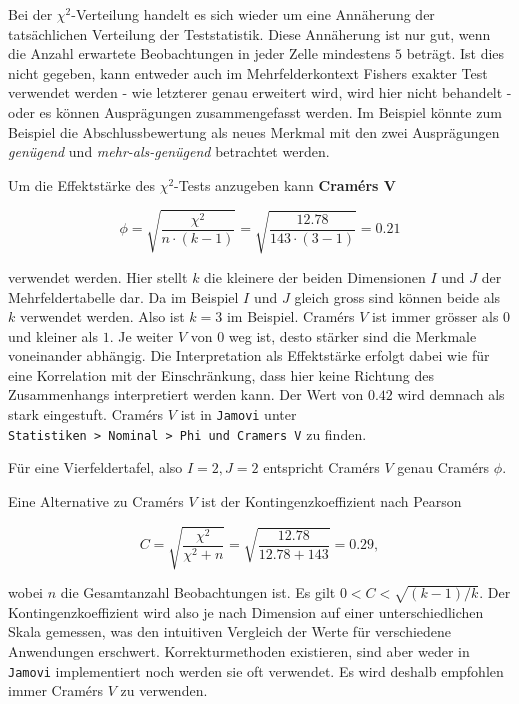 \documentclass[
]{book}
\theoremstyle{definition}
\theoremstyle{definition}
\theoremstyle{definition}
\theoremstyle{definition}
\theoremstyle{remark}
\begin{document}
Bei der \(\chi^2\)-Verteilung handelt es sich wieder um eine Annäherung der tatsächlichen Verteilung der Teststatistik. Diese Annäherung ist nur gut, wenn die Anzahl erwartete Beobachtungen in jeder Zelle mindestens \(5\) beträgt. Ist dies nicht gegeben, kann entweder auch im Mehrfelderkontext Fishers exakter Test verwendet werden - wie letzterer genau erweitert wird, wird hier nicht behandelt - oder es können Ausprägungen zusammengefasst werden. Im Beispiel könnte zum Beispiel die Abschlussbewertung als neues Merkmal mit den zwei Ausprägungen \emph{genügend} und \emph{mehr-als-genügend} betrachtet werden.

\label{customdef-cramers-v}{Um die Effektstärke des \(\chi^2\)-Tests anzugeben kann \textbf{Cramérs V}}

\[\phi = \sqrt{\frac{\chi^2}{n\cdot (k-1)}} = \sqrt{\frac{12.78}{143\cdot (3-1)}} = 0.21\]

verwendet werden. Hier stellt \(k\) die kleinere der beiden Dimensionen \(I\) und \(J\) der Mehrfeldertabelle dar. Da im Beispiel \(I\) und \(J\) gleich gross sind können beide als \(k\) verwendet werden. Also ist \(k = 3\) im Beispiel. Cramérs \(V\) ist immer grösser als \(0\) und kleiner als \(1\). Je weiter \(V\) von \(0\) weg ist, desto stärker sind die Merkmale voneinander abhängig. Die Interpretation als Effektstärke erfolgt dabei wie für eine Korrelation mit der Einschränkung, dass hier keine Richtung des Zusammenhangs interpretiert werden kann. Der Wert von \(0.42\) wird demnach als stark eingestuft. Cramérs \(V\) ist in \texttt{Jamovi} unter \texttt{Statistiken\ \textgreater{}\ Nominal\ \textgreater{}\ Phi\ und\ Cramer\textquotesingle{}s\ V} zu finden.

Für eine Vierfeldertafel, also \(I = 2, J = 2\) entspricht Cramérs \(V\) genau Cramérs \(\phi\).

Eine Alternative zu Cramérs \(V\) ist der Kontingenzkoeffizient nach Pearson

\[C = \sqrt{\frac{\chi^2}{\chi^2+n}} = \sqrt{\frac{12.78}{12.78+143}} = 0.29, \]

wobei \(n\) die Gesamtanzahl Beobachtungen ist. Es gilt \(0 < C < \sqrt{(k-1)/k}\). Der Kontingenzkoeffizient wird also je nach Dimension auf einer unterschiedlichen Skala gemessen, was den intuitiven Vergleich der Werte für verschiedene Anwendungen erschwert. Korrekturmethoden existieren, sind aber weder in \texttt{Jamovi} implementiert noch werden sie oft verwendet. Es wird deshalb empfohlen immer Cramérs \(V\) zu verwenden.
\end{document}
